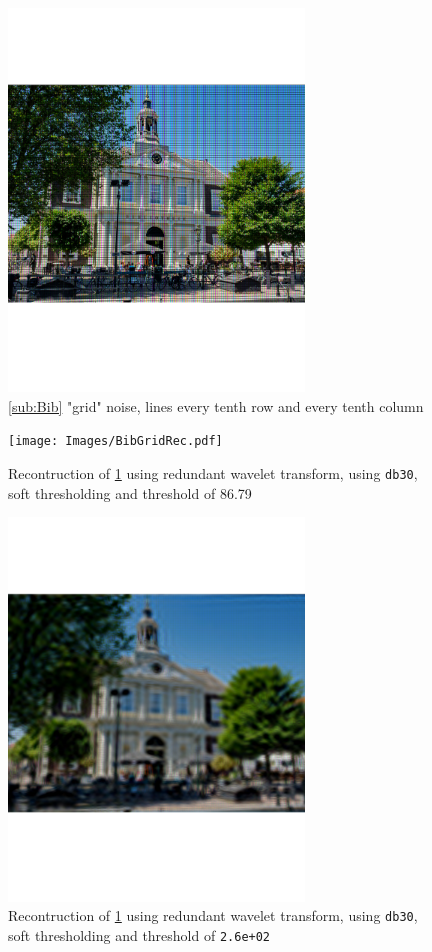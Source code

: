 \documentclass[a4paper]{article}
\begin{document}
    \begin{figure}[H]
	\centering
	\includegraphics[trim={0cm 6cm 0cm 5.5cm},clip,width=0.7\textwidth]{Images/BibGrid.pdf}
	\caption{\cref{sub:Bib} "grid" noise, lines every tenth row and every tenth column}
	\label{fig:BibGrid}
\end{figure}	

    \begin{figure}[H]
	\centering
	\texttt{[image: Images/BibGridRec.pdf]}
	\caption{Recontruction of \cref{fig:BibGrid} using redundant wavelet transform, using \texttt{db30}, soft thresholding and threshold of 86.79}
	\label{fig:BibGridRec}
\end{figure}

    \begin{figure}[H]
	\centering
	\includegraphics[trim={0cm 6cm 0cm 5.5cm},clip,width=0.7\textwidth]{Images/BibGridRec2.pdf}
	\caption{Recontruction of \cref{fig:BibGrid} using redundant wavelet transform, using \texttt{db30}, soft thresholding and threshold of \texttt{2.6e+02}}
	\label{fig:BibGridRec2}
\end{figure}
\end{document}
